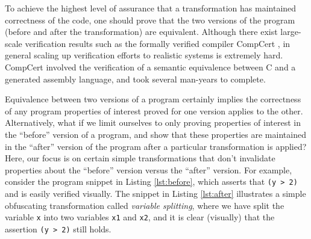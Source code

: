 \documentclass[compsoc,conference,a4paper,10pt,times]{IEEEtran}
\begin{document}
To achieve the highest level of assurance that a transformation has maintained correctness of the code, one should prove that the two versions of the program (before and after the transformation) are equivalent. Although there exist large-scale verification results such as the formally verified compiler CompCert \cite{CompCert}, in general scaling up verification efforts to realistic systems is extremely hard. CompCert involved the verification of a semantic equivalence between C and a generated assembly language, and took several man-years to complete. 

%
Equivalence between two versions of a program certainly implies the correctness of any program properties of interest proved for one version applies to the other.  Alternatively, what if we limit ourselves to only proving properties of interest in the ``before'' version of a program, and show that these properties are maintained in the ``after'' version of the program after a particular transformation is applied? 
%
Here, our focus is on certain simple transformations that don't invalidate properties about the ``before'' version versus the ``after'' version.  For example, consider the program snippet in Listing \ref{lst:before}, which asserts that \texttt{(y > 2)} and is easily verified visually. The snippet in Listing \ref{lst:after} illustrates a simple obfuscating transformation called \emph{variable splitting}, where we have split the variable \texttt{x} into two  variables \texttt{x1} and \texttt{x2}, and it is clear (visually) that the assertion \texttt{(y > 2)} still holds.
\end{document}
